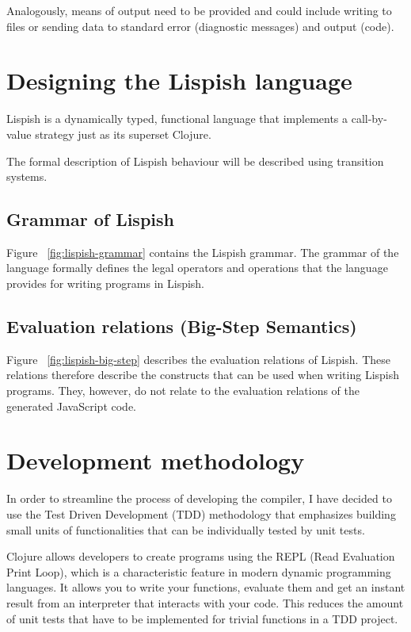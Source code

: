 Analogously, means of output need to be provided and could include writing to files or sending data to standard error (diagnostic messages) and output (code).

\section{Designing the Lispish language}\label{design-specification}

Lispish is a dynamically typed, functional language that implements a call-by-value strategy just as its superset Clojure.

The formal description of Lispish behaviour will be described using transition systems.

\subsection{Grammar of Lispish}



Figure ~\ref{fig:lispish-grammar} contains the Lispish grammar. The grammar of the language formally defines the legal operators and operations that the language provides for writing programs in Lispish.

\subsection{Evaluation relations (Big-Step Semantics)}

Figure ~\ref{fig:lispish-big-step} describes the evaluation relations of Lispish. These relations therefore describe the constructs that can be used when writing Lispish programs. They, however, do not relate to the evaluation relations of the generated JavaScript code. 



\section{Development methodology}
In order to streamline the process of developing the compiler, I have decided to use the Test Driven Development (TDD) methodology that emphasizes building small units of functionalities that can be individually tested by unit tests. 

Clojure allows developers to create programs using the REPL (Read Evaluation Print Loop), which is a characteristic feature in modern dynamic programming languages. It allows you to write your functions, evaluate them and get an instant result from an interpreter that interacts with your code. This reduces the amount of unit tests that have to be implemented for trivial functions in a TDD project. 

